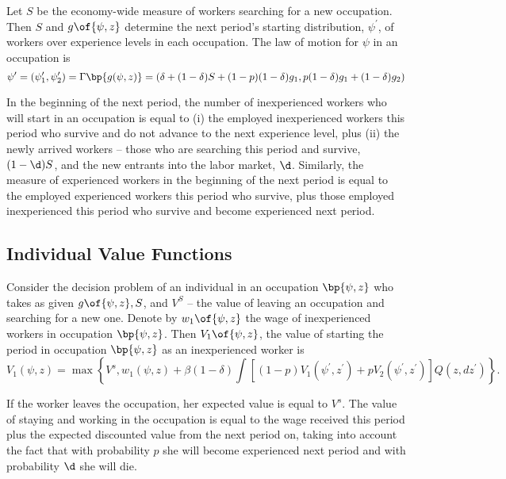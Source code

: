 \documentclass[12pt]{article}
\newcommand{\highlightR}[1]{{\emph{\color{MyRed}{#1}}}}
\theoremstyle{definition}
\begin{document}
\highlightR{WWZ's Notes: The assumption that occupations lie in a continuum space is important!}

Let $S$ be the economy-wide measure of workers searching for a new occupation. Then $S$ and $g\of{\psi, z}$ determine the next period's starting distribution, $\psi^{\prime}$, of workers over experience levels in each occupation. The law of motion for $\psi$ in an occupation is 
\begin{equation}
	\label{6}
	\psi^{\prime}=\left(\psi_1^{\prime}, \psi_2^{\prime}\right)=\Gamma\bp{g(\psi, z)}=\left(\delta+(1-\delta) S+(1-p)(1-\delta) g_1, p(1-\delta) g_1+(1-\delta) g_2\right)
\end{equation}

In the beginning of the next period, the number of inexperienced workers who will start in an occupation is equal to (i) the employed inexperienced workers this period who survive and do not advance to the next experience level, plus (ii) {the newly arrived workers -- those who are searching this period and survive, $(1-\d)S$}, and the new entrants into the labor market, $\d$. Similarly, the measure of experienced workers in the beginning of the next period is equal to the employed experienced workers this period who survive, plus those employed inexperienced this period who survive and become experienced next period.

\subsection{Individual Value Functions}
Consider the decision problem of an individual in an occupation $\bp{\psi, z}$ who takes as given $g\of{\psi, z}, S$, and $V^S$ -- the value of leaving an occupation and searching for a new one. Denote by $w_1\of{\psi, z}$ the wage of inexperienced workers in occupation $\bp{\psi, z}$. Then $V_1\of{\psi,z}$, the value of starting the period in occupation $\bp{\psi, z}$ as an inexperienced worker is 
\begin{equation}
	\label{7}
	V_1(\psi, z)=\max \left\{V^s, w_1(\psi, z)+\beta(1-\delta) \int\left[(1-p) V_1\left(\psi^{\prime}, z^{\prime}\right)+p V_2\left(\psi^{\prime}, z^{\prime}\right)\right] Q\left(z, d z^{\prime}\right)\right\} .
\end{equation}

If the worker leaves the occupation, her expected value is equal to $V^s$. The value of staying and working in the occupation is equal to the wage received this period plus the expected discounted value from the next period on, taking into account the fact that with probability $p$ she will become experienced next period and with probability $\d$ she will die.
\end{document}

